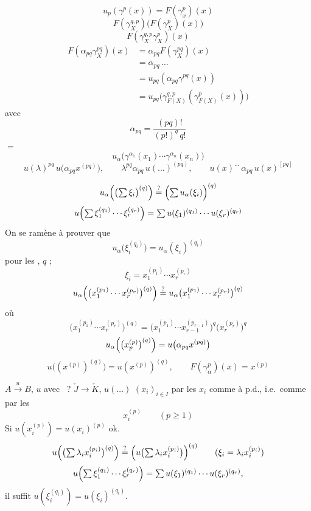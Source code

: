 \documentclass[11pt,a4paper]{article}
\begin{document}
\[
u_p(\gamma^p(x)) = F(\gamma^p_x)(x)
\]
\[
F(\gamma^{q,p}_X)\bigl(F(\gamma^p_X)(x)\bigr)
\]
\[
F(\gamma^{q,p}_X\gamma^p_X)(x)
\]
\[
\begin{aligned}
F(\alpha_{pq}\gamma^{pq}_X)(x) &= \alpha_{pq}F(\gamma^{pq}_X)(x) \\
&= \alpha_{pq}\,\ldots \\
&= u_{pq}(\alpha_{pq}\gamma^{pq}(x)) \\
&= u_{pq}\bigl(\gamma^{q,p}_{F(X)}(\gamma^p_{F(X)}(x))\bigr)
\end{aligned}
\]
avec
\[
\alpha_{pq} = \frac{(pq)!}{(p!)^q\,q!}
\]
\ill{} $=$ \ill{}
\[
u_\alpha\bigl(\gamma^{\alpha_1}(x_1)\cdots\gamma^{\alpha_n}(x_n)\bigr)
\]
\[
u(\lambda)^{pq}\,u\bigl(\alpha_{pq}x^{(pq)}\bigr), \qquad
\lambda^{pq}\alpha_{pq}\,u(\ldots)^{(pq)}, \qquad
u(x)^{\ldots}\,\alpha_{pq}\,u(x)^{[pq]}
\]

\[
u_\alpha\Bigl(\bigl(\textstyle\sum\xi_i\bigr)^{(q)}\Bigr) \overset{?}{=} \Bigl(\textstyle\sum u_\alpha(\xi_i)\Bigr)^{(q)}
\]
\[
u\Bigl(\textstyle\sum \xi_1^{(q_1)}\cdots\xi_r^{(q_r)}\Bigr) = \textstyle\sum u(\xi_1)^{(q_1)}\cdots u(\xi_r)^{(q_r)}
\]
On se ramène à prouver que
\[
u_\alpha\bigl(\xi_i^{(q_i)}\bigr) = u_\alpha(\xi_i)^{(q_i)}
\]
pour les , \ill{} $q$ ;   \ill{}
\[
\xi_i = x_1^{(p_1)}\cdots x_r^{(p_r)}
\]
\[
u_\alpha\Bigl(\bigl(x_1^{(p_1)}\cdots x_r^{(p_r)}\bigr)^{(q)}\Bigr) \overset{?}{=}
u_\alpha\bigl(x_1^{(p_1)}\cdots x_r^{(p_r)}\bigr)^{(q)}
\]
où
\[
\bigl(x_1^{(p_1)}\cdots x_r^{(p_r)}\bigr)^{(q)} =
\bigl(x_1^{(p_1)}\cdots x_{r-1}^{(p_{r-1})}\bigr)^{q}\bigl(x_r^{(p_r)}\bigr)^{q}
\]
\[
u_\alpha\Bigl(\bigl(x_p^{(p)}\bigr)^{(q)}\Bigr) = u\bigl(\alpha_{pq}x^{(pq)}\bigr)
\]
\[
u\bigl((x^{(p)})^{(q)}\bigr) = u(x^{(p)})^{(q)}, \qquad F(\gamma^p_\alpha)(x) = x^{(p)}
\]

$A \xrightarrow{u} B$, $u$  avec \ill{}~? \quad $\check J \to \check K$, \quad $u(\ldots)$
$(x_i)_{i\in I}$  par les $x_i$ comme  à p.d., i.e.\ comme   par les
\[
x_i^{(p)} \qquad (p\ge1)
\]
Si $u(x_i^{(p)}) = u(x_i)^{(p)}$ ok.
\[
u\Bigl(\bigl(\textstyle\sum\lambda_ix_i^{(p_i)}\bigr)^{(q)}\Bigr) \overset{?}{=}
\Bigl(u\bigl(\textstyle\sum\lambda_ix_i^{(p_i)}\bigr)\Bigr)^{(q)}
\qquad (\xi_i = \lambda_ix_i^{(p_i)})
\]
\[
u\Bigl(\textstyle\sum\xi_1^{(q_1)}\cdots\xi_r^{(q_r)}\Bigr) =
\textstyle\sum u(\xi_1)^{(q_1)}\cdots u(\xi_r)^{(q_r)},
\]
il suffit $u(\xi_i^{(q_i)}) = u(\xi_i)^{(q_i)}$.
\end{document}
